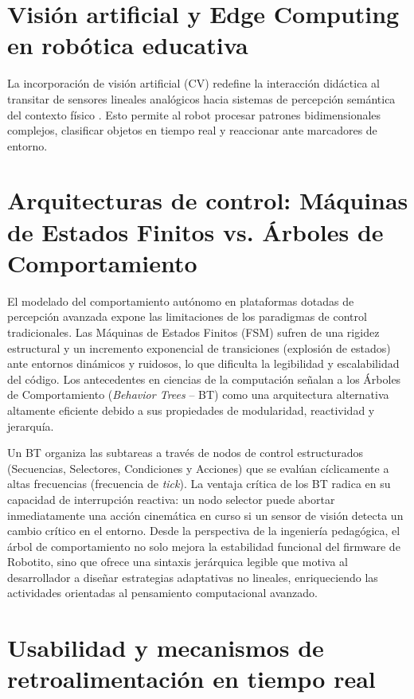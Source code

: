 \documentclass{prgrado}
\begin{document}
\section{Visión artificial y Edge Computing en robótica educativa}

La incorporación de visión artificial (CV) redefine la interacción didáctica al transitar de sensores lineales analógicos hacia sistemas de percepción semántica del contexto físico \cite{sophokleous2021computerVisionEducationalRobotics}.  Esto permite al robot procesar patrones bidimensionales complejos, clasificar objetos en tiempo real y reaccionar ante marcadores de entorno. 

\section{Arquitecturas de control: Máquinas de Estados Finitos vs. Árboles de Comportamiento}

El modelado del comportamiento autónomo en plataformas dotadas de percepción avanzada expone las limitaciones de los paradigmas de control tradicionales. Las Máquinas de Estados Finitos (FSM) sufren de una rigidez estructural y un incremento exponencial de transiciones (explosión de estados) ante entornos dinámicos y ruidosos, lo que dificulta la legibilidad y escalabilidad del código. Los antecedentes en ciencias de la computación señalan a los Árboles de Comportamiento (\textit{Behavior Trees} -- BT) como una arquitectura alternativa altamente eficiente \cite{colledanchise2018bt,iovino2020survey} debido a sus propiedades de modularidad, reactividad y jerarquía.

Un BT organiza las subtareas a través de nodos de control estructurados (Secuencias, Selectores, Condiciones y Acciones) que se evalúan cíclicamente a altas frecuencias (frecuencia de \textit{tick}). La ventaja crítica de los BT radica en su capacidad de interrupción reactiva: un nodo selector puede abortar inmediatamente una acción cinemática en curso si un sensor de visión detecta un cambio crítico en el entorno. Desde la perspectiva de la ingeniería pedagógica, el árbol de comportamiento no solo mejora la estabilidad funcional del firmware de Robotito, sino que ofrece una sintaxis jerárquica legible que motiva al desarrollador a diseñar estrategias adaptativas no lineales, enriqueciendo las actividades orientadas al pensamiento computacional avanzado.

\section{Usabilidad y mecanismos de retroalimentación en tiempo real}
\end{document}
